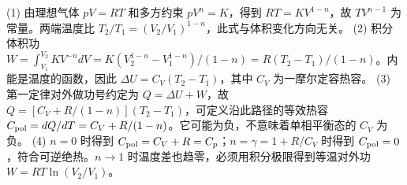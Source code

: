 (1) 由理想气体 \(pV=RT\) 和多方约束 \(pV^n=K\)，得到 \(RT=KV^{1-n}\)，故 \(TV^{n-1}\) 为常量。两端温度比 \(T_2/T_1=(V_2/V_1)^{1-n}\)，此式与体积变化方向无关。
(2) 积分体积功 \(W=\int_{V_1}^{V_2}KV^{-n}dV=K(V_2^{1-n}-V_1^{1-n})/(1-n)=R(T_2-T_1)/(1-n)\)。内能是温度的函数，因此 \(\Delta U=C_V(T_2-T_1)\)，其中 \(C_V\) 为一摩尔定容热容。
(3) 第一定律对外做功号约定为 \(Q=\Delta U+W\)，故 \(Q=[C_V+R/(1-n)](T_2-T_1)\)，可定义沿此路径的等效热容 \(C_{\rm pol}=dQ/dT=C_V+R/(1-n)\)。它可能为负，不意味着单相平衡态的 \(C_V\) 为负。
(4) \(n=0\) 时得到 \(C_{\rm pol}=C_V+R=C_p\)；\(n=\gamma=1+R/C_V\) 时得到 \(C_{\rm pol}=0\)，符合可逆绝热。\(n\to1\) 时温度差也趋零，必须用积分极限得到等温对外功 \(W=RT\ln(V_2/V_1)\)。
